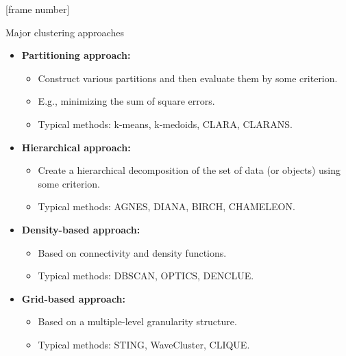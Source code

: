 \documentclass[aspectratio=169,t,xcolor=dvipsnames]{beamer}
\begin{document}
  {
    [frame number]
    \begin{frame}{Major clustering approaches}
        \begin{itemize}
          \item \textbf{Partitioning approach:}
          \begin{itemize}
            \item Construct various partitions and then evaluate them by some criterion.
            \item E.g., minimizing the sum of square errors.
            \item Typical methods: k-means, k-medoids, CLARA, CLARANS.
          \end{itemize}
          \item \textbf{Hierarchical approach:}
          \begin{itemize}
            \item Create a hierarchical decomposition of the set of data (or objects) using some criterion.
            \item Typical methods: AGNES, DIANA, BIRCH, CHAMELEON.
          \end{itemize}
          \item \textbf{Density-based approach:}
          \begin{itemize}
            \item Based on connectivity and density functions.
            \item Typical methods: DBSCAN, OPTICS, DENCLUE.
          \end{itemize}
          \item \textbf{Grid-based approach:}
          \begin{itemize}
            \item Based on a multiple-level granularity structure.
            \item Typical methods: STING, WaveCluster, CLIQUE.
          \end{itemize}
        \end{itemize}
    \end{frame}
  }
\end{document}

